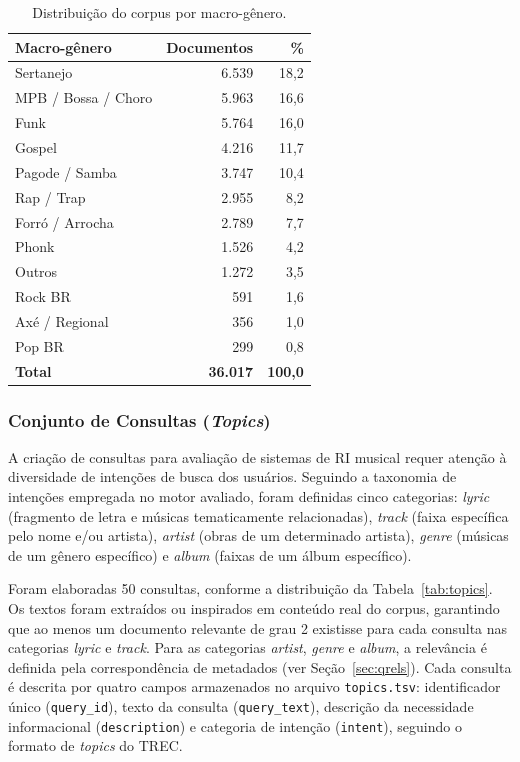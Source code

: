 \documentclass[12pt]{article}
\begin{document}
\begin{table}[ht]
\centering
\caption{Distribuição do corpus por macro-gênero.}
\label{tab:corpus}
\begin{tabular}{lrr}
\toprule
\textbf{Macro-gênero} & \textbf{Documentos} & \textbf{\%} \\
\midrule
Sertanejo          & 6.539 & 18{,}2 \\
MPB / Bossa / Choro & 5.963 & 16{,}6 \\
Funk               & 5.764 & 16{,}0 \\
Gospel             & 4.216 & 11{,}7 \\
Pagode / Samba     & 3.747 & 10{,}4 \\
Rap / Trap         & 2.955 & 8{,}2 \\
Forró / Arrocha    & 2.789 & 7{,}7 \\
Phonk              & 1.526 & 4{,}2 \\
Outros             & 1.272 & 3{,}5 \\
Rock BR            & 591   & 1{,}6 \\
Axé / Regional     & 356   & 1{,}0 \\
Pop BR             & 299   & 0{,}8 \\
\midrule
\textbf{Total}     & \textbf{36.017} & \textbf{100{,}0} \\
\bottomrule
\end{tabular}
\end{table}

\subsubsection{Conjunto de Consultas (\textit{Topics})}

A criação de consultas para avaliação de sistemas de RI musical requer atenção à
diversidade de intenções de busca dos usuários. Seguindo a taxonomia de
intenções empregada no motor avaliado, foram definidas cinco categorias:
\textit{lyric} (fragmento de letra e músicas tematicamente relacionadas),
\textit{track} (faixa específica pelo nome e/ou artista), \textit{artist} (obras
de um determinado artista), \textit{genre} (músicas de um gênero específico) e
\textit{album} (faixas de um álbum específico).

Foram elaboradas 50 consultas, conforme a distribuição da Tabela~\ref{tab:topics}.
Os textos foram extraídos ou inspirados em conteúdo real do corpus, garantindo
que ao menos um documento relevante de grau 2 existisse para cada consulta nas
categorias \textit{lyric} e \textit{track}. Para as categorias \textit{artist},
\textit{genre} e \textit{album}, a relevância é definida pela correspondência de
metadados (ver Seção~\ref{sec:qrels}). Cada consulta é descrita por quatro campos
armazenados no arquivo \texttt{topics.tsv}: identificador único
(\texttt{query\_id}), texto da consulta (\texttt{query\_text}), descrição da
necessidade informacional (\texttt{description}) e categoria de intenção
(\texttt{intent}), seguindo o formato de \textit{topics} do TREC.
\end{document}
